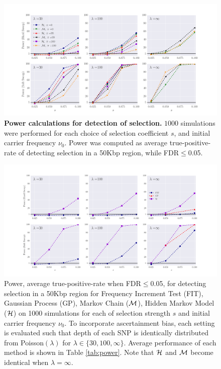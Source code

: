\documentclass[11pt]{article}
\begin{document}
\begin{figure}[H]
	\centering
	\includegraphics[trim=0.4in 0 .8in 0.02in , clip,width=\textwidth]{figures/powerCLR.pdf}
	\caption{{\bf Power calculations for detection of selection.} $1000$
          simulations were performed for each choice of selection
          coefficient $s$, and initial carrier frequency
          $\nu_0$. Power was computed as average true-positive-rate of
          detecting selection in a 50Kbp region, while
          FDR$\le$0.05.} \label{fig:powerCLR}
\end{figure}

\begin{figure}[H]
	\centering
	\includegraphics[trim=0.4in 0 .8in 0.02in , clip,width=\textwidth]{figures/power.pdf}
	\caption{ Power, average
          true-positive-rate when FDR$\le$0.05, for detecting
          selection in a 50Kbp region for Frequency Increment Test
          (FIT), Gaussian Process (GP), Markov Chain (${\cal M}$), Hidden
          Markov Model (${\cal H}$) on 1000 simulations for each of
          selection strength $s$ and initial carrier frequency
          $\nu_0$. To incorporate ascertainment bias, each setting is
          evaluated such that depth of each SNP is identically
          distributed from Poisson$(\lambda)$ for $\lambda \in
          \{30,100,\infty\}$. Average performance of each method is
          shown in Table \ref{tab:power}. Note that ${\cal H}$ and ${\cal M}$
          become identical when $\lambda=\infty$.  } \label{fig:power}
\end{figure}
\end{document}

